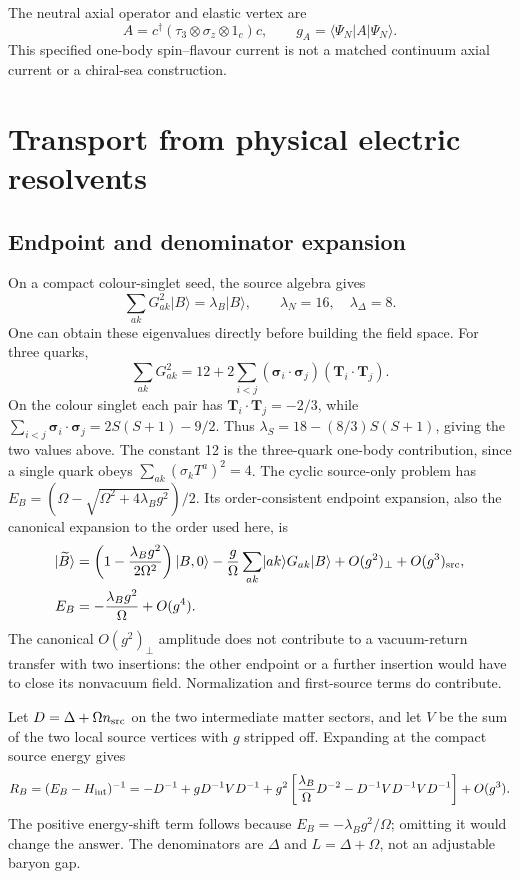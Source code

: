 \documentclass[11pt]{article}
\newcommand{\ket}[1]{\lvert #1\rangle}
\newcommand{\bra}[1]{\langle #1\rvert}
\begin{document}
The neutral axial operator and elastic vertex are
\begin{equation}
 A=c^\dagger(\tau_3\otimes\sigma_z\otimes1_c)c,\qquad
 g_A=\bra{\Psi_N}A\ket{\Psi_N}. \label{eq:axial}
\end{equation}
This specified one-body spin--flavour current is not a matched continuum axial current or a chiral-sea construction.

\section{Transport from physical electric resolvents}
\subsection{Endpoint and denominator expansion}
On a compact colour-singlet seed, the source algebra gives
\begin{equation}
 \sum_{ak}G_{ak}^2\ket B=\lambda_B\ket B,\qquad
 \lambda_N=16,\quad\lambda_\Delta=8.
\end{equation}
One can obtain these eigenvalues directly before building the field space. For three quarks,
\begin{equation}
 \sum_{ak}G_{ak}^2=12+2\sum_{i<j}
   (\bm\sigma_i\cdot\bm\sigma_j)(\bm T_i\cdot\bm T_j).
\end{equation}
On the colour singlet each pair has $\bm T_i\cdot\bm T_j=-2/3$, while
$\sum_{i<j}\bm\sigma_i\cdot\bm\sigma_j=2S(S+1)-9/2$.
Thus $\lambda_S=18-(8/3)S(S+1)$, giving the two values above. The constant 12 is the three-quark one-body contribution, since a single quark obeys $\sum_{ak}(\sigma_kT^a)^2=4$.
The cyclic source-only problem has $E_B=(\Omega-\sqrt{\Omega^2+4\lambda_Bg^2})/2$. Its order-consistent endpoint expansion, also the canonical expansion to the order used here, is
\begin{align}
 \ket{\widetilde B}&=\left(1-\frac{\lambda_Bg^2}{2\Omega^2}\right)\ket{B,0}
       -\frac g\Omega\sum_{ak}\ket{ak}G_{ak}\ket B+O(g^2)_{\perp}+O(g^3)_{\rm src},\\
 E_B&=-\frac{\lambda_Bg^2}{\Omega}+O(g^4). \label{eq:endpoint}
\end{align}
The canonical $O(g^2)_{\perp}$ amplitude does not contribute to a vacuum-return transfer with two insertions: the other endpoint or a further insertion would have to close its nonvacuum field. Normalization and first-source terms do contribute.

Let $D=\Delta+\Omega n_{\rm src}$ on the two intermediate matter sectors, and let $V$ be the sum of the two local source vertices with $g$ stripped off. Expanding at the compact source energy gives
\begin{equation}
 R_B=(E_B-H_{\rm int})^{-1}
 =-D^{-1}+gD^{-1}VD^{-1}
 +g^2\left[\frac{\lambda_B}{\Omega}D^{-2}
                 -D^{-1}VD^{-1}VD^{-1}\right]+O(g^3). \label{eq:resolvent}
\end{equation}
The positive energy-shift term follows because $E_B=-\lambda_Bg^2/\Omega$; omitting it would change the answer. The denominators are $\Delta$ and $L=\Delta+\Omega$, not an adjustable baryon gap.
\end{document}
